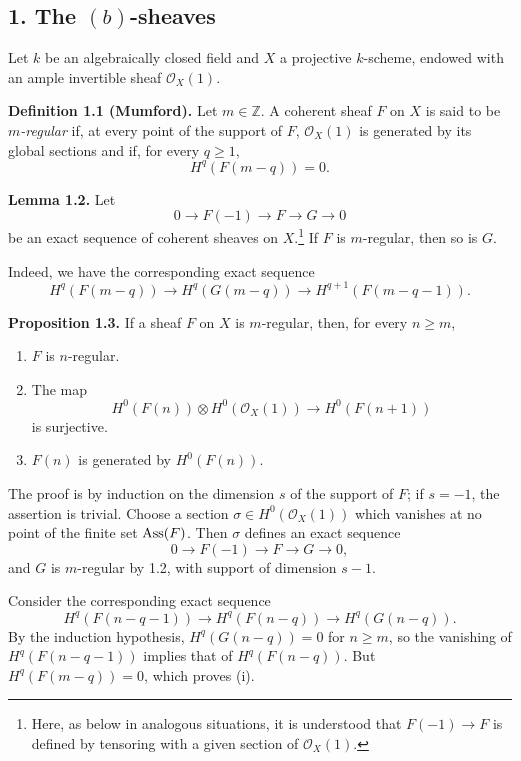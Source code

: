 \subsection*{1. The \texorpdfstring{\((b)\)}{(b)}-sheaves}

Let \(k\) be an algebraically closed field and \(X\) a projective
\(k\)-scheme, endowed with an ample invertible sheaf \(\mathcal O_X(1)\).

\textbf{Definition 1.1 (Mumford).} Let \(m\in\mathbb Z\). A coherent sheaf
\(F\) on \(X\) is said to be \emph{\(m\)-regular} if, at every point of the
support of \(F\), \(\mathcal O_X(1)\) is generated by its global sections
and if, for every \(q\geq1\),
\[
  H^q(F(m-q))=0.
\]

\textbf{Lemma 1.2.} Let
\[
  0\longrightarrow F(-1)\longrightarrow F\longrightarrow G\longrightarrow0
\]
be an exact sequence of coherent sheaves on \(X\).\footnote{Here, as below
in analogous situations, it is understood that \(F(-1)\to F\) is defined
by tensoring with a given section of \(\mathcal O_X(1)\).} If \(F\) is
\(m\)-regular, then so is \(G\).

Indeed, we have the corresponding exact sequence
\[
  H^q(F(m-q))\longrightarrow H^q(G(m-q))
  \longrightarrow H^{q+1}(F(m-q-1)).
\]

\textbf{Proposition 1.3.} If a sheaf \(F\) on \(X\) is \(m\)-regular,
then, for every \(n\geq m\),
\begin{enumerate}[label=(\roman*)]
\item \(F\) is \(n\)-regular.
\item The map
\[
  H^0(F(n))\otimes H^0(\mathcal O_X(1))
  \longrightarrow H^0(F(n+1))
\]
is surjective.
\item \(F(n)\) is generated by \(H^0(F(n))\).
\end{enumerate}

\newpage
The proof is by induction on the dimension \(s\) of the support of \(F\); if
\(s=-1\), the assertion is trivial. Choose a section
\(\sigma\in H^0(\mathcal O_X(1))\) which vanishes at no point of the finite
set \(\operatorname{Ass}(F)\). Then \(\sigma\) defines an exact sequence
\[
  0\longrightarrow F(-1)\longrightarrow F\longrightarrow G\longrightarrow0,
\]
and \(G\) is \(m\)-regular by 1.2, with support of dimension \(s-1\).

Consider the corresponding exact sequence
\[
  H^q(F(n-q-1))\longrightarrow H^q(F(n-q))
  \longrightarrow H^q(G(n-q)).
\]
By the induction hypothesis, \(H^q(G(n-q))=0\) for \(n\geq m\), so the
vanishing of \(H^q(F(n-q-1))\) implies that of \(H^q(F(n-q))\). But
\(H^q(F(m-q))=0\), which proves (i).

